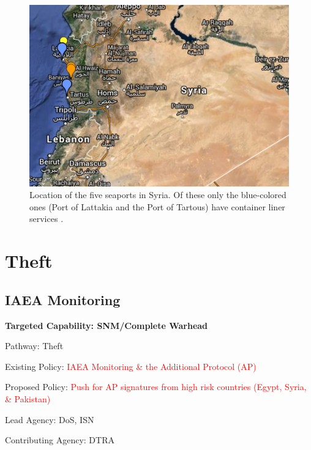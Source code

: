\documentclass{report}
\begin{document}
\begin{figure}
 \centering
 \includegraphics[trim = 0cm 0cm 0cm 0cm, clip,scale=0.85]{./figures/seaports.png}
   \caption[Location of the five seaports in Syria \cite{WorldPortSource2014}.]{Location of the five seaports in Syria. Of these only the blue-colored ones (Port of Lattakia and the Port of Tartous) have container liner services \cite{WorldPortSource2014}.}
     \label{fig:seaports}
\end{figure}





\section{Theft}


\subsection{IAEA Monitoring}



\bfseries Targeted Capability: SNM/Complete Warhead

Pathway: Theft

Existing Policy:  \textcolor{red}{IAEA Monitoring \& the Additional Protocol (AP)}

Proposed Policy:  \textcolor{red}{Push for AP signatures from high risk countries (Egypt, Syria, \& Pakistan)}

Lead Agency: DoS, ISN

Contributing Agency: DTRA \normalfont
\end{document}
